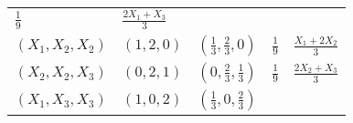 \documentclass[
]{book}
\theoremstyle{definition}
\theoremstyle{definition}
\theoremstyle{definition}
\theoremstyle{remark}
\begin{document}
\begin{longtable}[]{@{}lllll@{}}
\begin{minipage}[t]{0.17\columnwidth}
\(\frac{1}{9}\)\strut
\end{minipage} & \begin{minipage}[t]{0.18\columnwidth}\raggedright
\(\frac{2X_1+X_3}{3}\)\strut
\end{minipage}\tabularnewline
\begin{minipage}[t]{0.18\columnwidth}\raggedright
\(\left( X_1,X_2,X_2 \right)\)\strut
\end{minipage} & \begin{minipage}[t]{0.16\columnwidth}\raggedright
\(\left( 1,2,0 \right)\)\strut
\end{minipage} & \begin{minipage}[t]{0.16\columnwidth}\raggedright
\(\left( \frac{1}{3},\frac{2}{3},0 \right)\)\strut
\end{minipage} & \begin{minipage}[t]{0.17\columnwidth}\raggedright
\(\frac{1}{9}\)\strut
\end{minipage} & \begin{minipage}[t]{0.18\columnwidth}\raggedright
\(\frac{X_1+2X_2}{3}\)\strut
\end{minipage}\tabularnewline
\begin{minipage}[t]{0.18\columnwidth}\raggedright
\(\left( X_2,X_2,X_3 \right)\)\strut
\end{minipage} & \begin{minipage}[t]{0.16\columnwidth}\raggedright
\(\left( 0,2,1 \right)\)\strut
\end{minipage} & \begin{minipage}[t]{0.16\columnwidth}\raggedright
\(\left( 0,\frac{2}{3},\frac{1}{3} \right)\)\strut
\end{minipage} & \begin{minipage}[t]{0.17\columnwidth}\raggedright
\(\frac{1}{9}\)\strut
\end{minipage} & \begin{minipage}[t]{0.18\columnwidth}\raggedright
\(\frac{2X_2+X_3}{3}\)\strut
\end{minipage}\tabularnewline
\begin{minipage}[t]{0.18\columnwidth}\raggedright
\(\left( X_1,X_3,X_3 \right)\)\strut
\end{minipage} & \begin{minipage}[t]{0.16\columnwidth}\raggedright
\(\left( 1,0,2 \right)\)\strut
\end{minipage} & \begin{minipage}[t]{0.16\columnwidth}\raggedright
\(\left( \frac{1}{3},0,\frac{2}{3} \right)\)\strut

\end{minipage}
\end{longtable}
\end{document}
